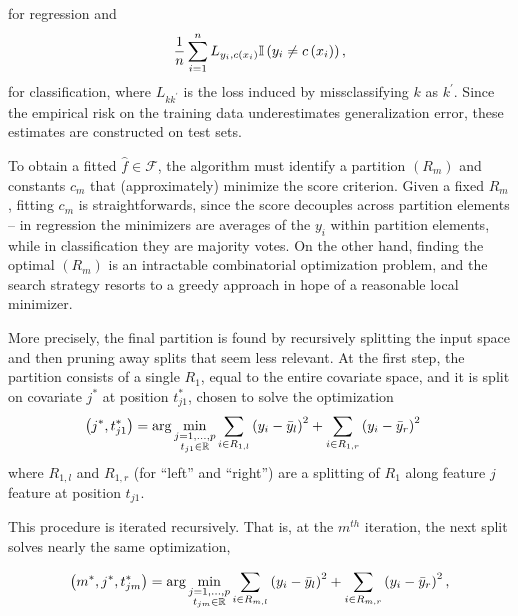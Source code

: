 \documentclass[14pt]{extarticle}
\begin{document}
for regression and
\begin{align*}
  \frac{1}{n} \sum_{i = 1}^{n} L_{y_{i}, c\left(x_{i}\right)} \mathbb{I}\left({y_{i} \neq c\left(x_{i}\right)}\right),
\end{align*}
for classification, where $L_{kk^{\prime}}$ is the loss induced by
missclassifying $k$ as $k^{\prime}$. Since the empirical risk on the training
data underestimates generalization error, these estimates are constructed on
test sets.

To obtain a fitted $\hat{f} \in \mathcal{F}$, the algorithm must identify a
partition $\left(R_{m}\right)$ and constants $c_{m}$ that (approximately)
minimize the score criterion. Given a fixed $R_{m}$, fitting $c_{m}$ is
straightforwards, since the score decouples across partition elements -- in
regression the minimizers are averages of the $y_{i}$ within partition elements,
while in classification they are majority votes. On the other hand, finding the
optimal $\left(R_{m}\right)$ is an intractable combinatorial optimization
problem, and the search strategy resorts to a greedy approach in hope of a
reasonable local minimizer.

More precisely, the final partition is found by recursively splitting the input
space and then pruning away splits that seem less relevant. At the first step,
the partition consists of a single $R_{1}$, equal to the entire covariate space,
and it is split on covariate $j^{\ast}$ at position $t_{j1}^{\ast}$, chosen to
solve the optimization
\begin{align*}
  \left(j^{\ast}, t_{j1}^{\ast}\right) &= \arg \min_{\substack{j = 1, \dots, p \\ t_{j1} \in \mathbb{R}}} \sum_{i \in R_{1, l}} \left(y_{i} - \bar{y}_{l}\right)^{2} + \sum_{i \in R_{1, r}} \left(y_{i} - \bar{y}_{r}\right)^{2}
\end{align*}
where $R_{1, l}$ and $R_{1, r}$ (for ``left'' and ``right'') are a splitting of
$R_{1}$ along feature $j$ feature at position $t_{j1}$.

This procedure is iterated recursively. That is, at the $m^{th}$ iteration, the
next split solves nearly the same optimization,

\begin{align*}
  \left(m^{\ast}, j^{\ast}, t_{jm}^{\ast}\right) = \arg \min_{\substack{j = 1, \dots, p \\ t_{jm} \in \mathbb{R}}}
  \sum_{i \in R_{m, l}} \left(y_{i} - \bar{y}_{l}\right)^{2} +
  \sum_{i \in R_{m, r}} \left(y_{i} - \bar{y}_{r}\right)^{2},
\end{align*}
\end{document}

